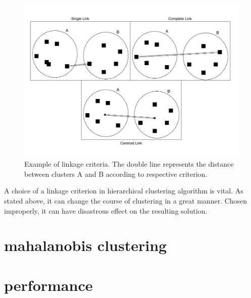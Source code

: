 \begin{figure}\centering
	\includegraphics[width=\linewidth]{img/linkage_criteria}
	\caption{Example of linkage criteria. The double line represents the distance between clusters A and B according to respective criterion.}
	\label{fig01:link}
\end{figure}

A choice of a linkage criterion in hierarchical clustering algorithm is vital. As stated above, it can change the course of clustering in a great manner. Chosen improperly, it can have disastrous effect on the resulting solution.

\section{mahalanobis clustering}


\section{performance}
